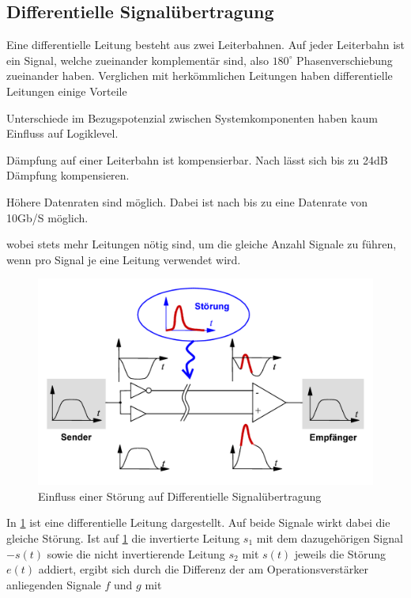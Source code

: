 \subsection{Differentielle Signalübertragung}
Eine differentielle Leitung besteht aus zwei Leiterbahnen. Auf jeder Leiterbahn ist ein Signal, welche zueinander komplementär sind, also $180^\circ $  Phasenverschiebung zueinander haben. Verglichen mit herkömmlichen Leitungen haben differentielle Leitungen einige Vorteile 
\begin{description}
\item Unterschiede im Bezugspotenzial zwischen Systemkomponenten haben kaum Einfluss auf Logiklevel.
\item Dämpfung auf einer Leiterbahn ist kompensierbar. Nach \cite{DifferentialSignalLine} lässt sich bis zu 24dB Dämpfung kompensieren.
\item Höhere Datenraten sind möglich. Dabei ist nach \cite{DifferentialSignalLine} bis zu  eine Datenrate von 10Gb/S möglich.
\end{description}
wobei stets mehr Leitungen nötig sind, um die gleiche Anzahl Signale zu führen, wenn pro Signal je eine Leitung verwendet wird. 
\begin{figure}[tbp]
  \centering
  \includegraphics[scale=1.5]{gfx/DiffSignalUebertragung.png}
  \caption{Einfluss einer Störung auf Differentielle Signalübertragung\cite{DiffSig}}
  \label{fig:DiffSig}
\end{figure}
In \ref{fig:DiffSig} ist eine differentielle Leitung dargestellt. Auf beide Signale wirkt dabei die gleiche Störung. Ist auf \ref{fig:DiffSig} die invertierte Leitung $s_{1}$ mit dem dazugehörigen Signal $-s(t)$ sowie die nicht invertierende Leitung $s_{2}$ mit $s(t)$ jeweils die Störung $e(t)$ addiert, ergibt sich durch die Differenz der am Operationsverstärker anliegenden Signale $f$ und $g$ mit 
